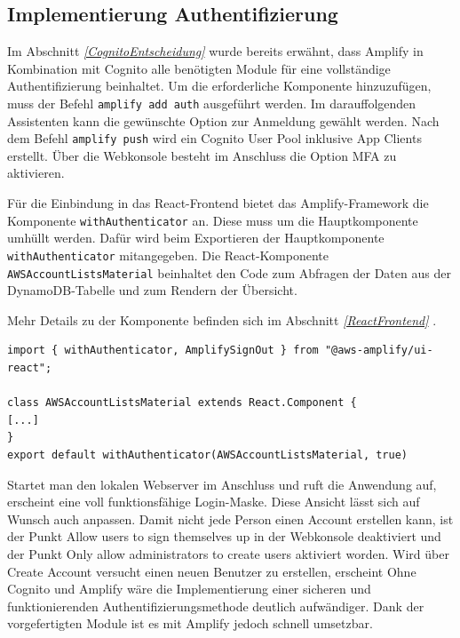 \subsection{Implementierung Authentifizierung}
\label{ImpAuth}
Im Abschnitt \textit{\ref{CognitoEntscheidung} } wurde bereits erwähnt, dass Amplify in Kombination mit Cognito
alle benötigten Module für eine vollständige Authentifizierung beinhaltet.
Um die erforderliche Komponente hinzuzufügen, muss der Befehl \verb+amplify add auth+ ausgeführt werden.
Im darauffolgenden Assistenten kann die gewünschte Option zur Anmeldung gewählt werden.
Nach dem Befehl \verb+amplify push+ wird ein Cognito User Pool inklusive App Clients erstellt.
Über die Webkonsole besteht im Anschluss die Option MFA zu aktivieren.

Für die Einbindung in das React-Frontend bietet das Amplify-Framework die Komponente \verb+withAuthenticator+ an.
Diese muss um die Hauptkomponente umhüllt werden.
Dafür wird beim Exportieren der Hauptkomponente \verb+withAuthenticator+ mitangegeben. \cite[]{ImpAuth}
Die React-Komponente \verb+AWSAccountListsMaterial+ beinhaltet den Code zum Abfragen der Daten aus der DynamoDB-Tabelle und zum Rendern der Übersicht.

Mehr Details zu der Komponente befinden sich im Abschnitt \textit{\ref{ReactFrontend} }.
\\
\begin{lstlisting}[basicstyle=\ttfamily\small, breaklines=true , frame = single, backgroundcolor=\color{flashwhite},caption={Auszug aus React-Frontend (Datei: \textit{\nameref{lst:React AccountList}} )} ]
import { withAuthenticator, AmplifySignOut } from "@aws-amplify/ui-react";

class AWSAccountListsMaterial extends React.Component {
[...]
}
export default withAuthenticator(AWSAccountListsMaterial, true)
    \end{lstlisting}



Startet man den lokalen Webserver im Anschluss und ruft die Anwendung auf, erscheint eine voll funktionsfähige Login-Maske.
Diese Ansicht lässt sich auf Wunsch auch anpassen.
Damit nicht jede Person einen Account erstellen kann, ist der Punkt \glqq Allow users to sign themselves up\grqq{} in der Webkonsole deaktiviert und der Punkt \glqq Only allow administrators to create users\grqq{} aktiviert worden.
Wird über \glqq Create Account\grqq{} versucht einen neuen Benutzer zu erstellen, erscheint
Ohne Cognito und Amplify wäre die Implementierung einer sicheren und funktionierenden Authentifizierungsmethode deutlich aufwändiger.
Dank der vorgefertigten Module ist es mit Amplify jedoch schnell umsetzbar.

